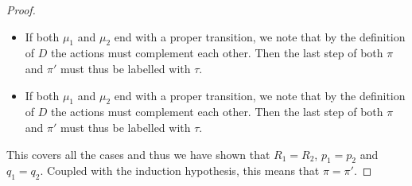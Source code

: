 \begin{proof}
\begin{itemize}
        \item If both $\mu_1$ and $\mu_2$ end with a proper transition, we note that by
        the definition of $D$ the actions must complement each other. Then
        the last step of both $\pi$ and $\pi'$ must thus be labelled with $\tau$.
        
        \item If both $\mu_1$ and $\mu_2$ end with a proper transition, we note that by
        the definition of $D$ the actions must complement each other. Then
        the last step of both $\pi$ and $\pi'$ must thus be labelled with $\tau$.
    \end{itemize}
    This covers all the cases and thus we have shown that $R_1=R_2$, $p_1=p_2$
    and $q_1=q_2$. Coupled with the induction hypothesis, this means that $\pi=\pi'$.
\end{proof}

